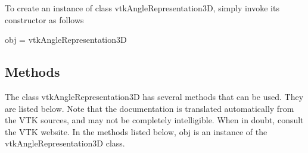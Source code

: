 To create an instance of class vtk\-Angle\-Representation3\-D, simply invoke its constructor as follows \begin{DoxyVerb}  obj = vtkAngleRepresentation3D
\end{DoxyVerb}
 \hypertarget{vtkwidgets_vtkxyplotwidget_Methods}{}\subsection{Methods}\label{vtkwidgets_vtkxyplotwidget_Methods}
The class vtk\-Angle\-Representation3\-D has several methods that can be used. They are listed below. Note that the documentation is translated automatically from the V\-T\-K sources, and may not be completely intelligible. When in doubt, consult the V\-T\-K website. In the methods listed below, {\ttfamily obj} is an instance of the vtk\-Angle\-Representation3\-D class. 
